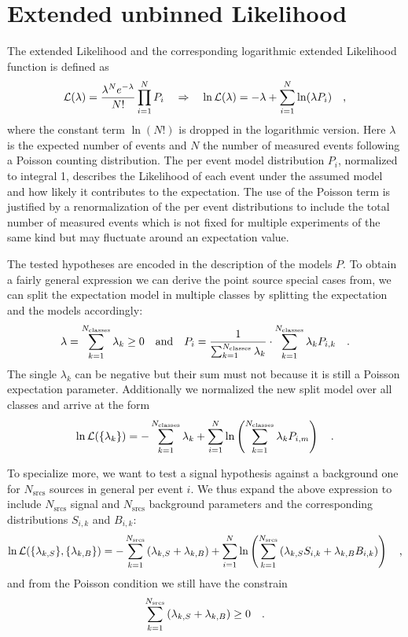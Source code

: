 \section{Extended unbinned Likelihood}
The extended Likelihood  and the corresponding logarithmic extended Likelihood function is defined as
\begin{equation}
  \mathcal{L}(\lambda) = \frac{\lambda^N e^{-\lambda}}{N!}\prod_{i=1}^N P_i
  \quad\Rightarrow\quad
    \ln\mathcal{L}(\lambda) = -\lambda+\sum_{i=1}^N \ln(\lambda P_i)
  \quad\text{,}
\end{equation}
where the constant term $\ln(N!)$ is dropped in the logarithmic version.
Here $\lambda$ is the expected number of events and $N$ the number of measured events following a Poisson counting distribution.
The per event model distribution $P_i$, normalized to integral 1, describes the Likelihood of each event under the assumed model and how likely it contributes to the expectation.
The use of the Poisson term is justified by a renormalization of the per event distributions to include the total number of measured events which is not fixed for multiple experiments of the same kind but may fluctuate around an expectation value.

The tested hypotheses are encoded in the description of the models $P$.
To obtain a fairly general expression we can derive the point source special cases from, we can split the expectation model in multiple classes by splitting the expectation and the models accordingly:
\begin{equation}
  \lambda = \sum_{k=1}^{N_\text{classes}} \lambda_k \geq 0
  \quad\text{and}\quad
  P_i = \frac{1}{\sum_{k=1}^{N_\text{classes}} \lambda_k}\cdot
         \sum_{k=1}^{N_\text{classes}} \lambda_k P_{i,k}
  \quad\text{.}
\end{equation}
The single $\lambda_k$ can be negative but their sum must not because it is still a Poisson expectation parameter.
Additionally we normalized the new split model over all classes and arrive at the form
\begin{equation}
  \ln\mathcal{L}(\{\lambda_k\})
  = -\sum_{k=1}^{N_\text{classes}} \lambda_k +
    \sum_{i=1}^N \ln\left(\sum_{k=1}^{N_\text{classes}}
      \lambda_k P_{i,m} \right)
  \quad\text{.}
\end{equation}

To specialize more, we want to test a signal hypothesis against a background one for $N_\text{srcs}$ sources in general per event $i$.
We thus expand the above expression to include $N_\text{srcs}$ signal and $N_\text{srcs}$ background parameters and the corresponding distributions $S_{i,k}$ and $B_{i,k}$:
\begin{equation}
  \ln\mathcal{L}(\{\lambda_{k,S}\}, \{\lambda_{k,B}\})
  = -\sum_{k=1}^{N_\text{srcs}}\left(\lambda_{k,S}+\lambda_{k,B}\right) +
    \sum_{i=1}^N \ln\left(\sum_{k=1}^{N_\text{srcs}}\left(
      \lambda_{k,S} S_{i,k}+\lambda_{k,B} B_{i,k}\right)\right)
  \quad\text{,}
\end{equation}
and from the Poisson condition we still have the constrain
\begin{equation}
  \sum_{k=1}^{N_\text{srcs}}\left(\lambda_{k,S}+\lambda_{k,B}\right) \geq 0
  \quad\text{.}
\end{equation}

